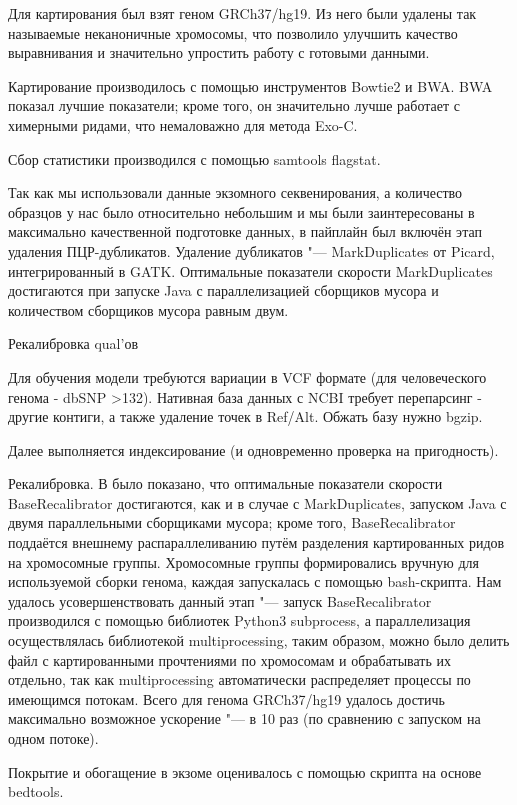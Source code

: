 \documentclass[a4paper,12pt]{article}
\begin{document}
Для картирования был взят геном GRCh37/hg19.
Из него были удалены так называемые неканоничные хромосомы, что позволило улучшить качество выравнивания и значительно упростить работу с готовыми данными.

Картирование производилось с помощью инструментов Bowtie2\cite{bowtie2} и BWA\cite{bwa}.
BWA показал лучшие показатели;
кроме того, он значительно лучше работает с химерными ридами, что немаловажно для метода Exo-C.

Сбор статистики производился с помощью samtools flagstat.

Так как мы использовали данные экзомного секвенирования, а количество образцов у нас было относительно небольшим и мы были заинтересованы в максимально качественной подготовке данных, в пайплайн был включён этап удаления ПЦР-дубликатов.
Удаление дубликатов "--- MarkDuplicates от Picard\cite{picard}, интегрированный в GATK.
Оптимальные показатели скорости MarkDuplicates достигаются при запуске Java с параллелизацией сборщиков мусора и количеством сборщиков мусора равным двум\cite{heldenbrand}.

Рекалибровка qual'ов

Для обучения модели требуются вариации в VCF формате (для человеческого генома - dbSNP >132). Нативная база данных с NCBI требует перепарсинг - другие контиги, а также удаление точек в Ref/Alt. Обжать базу нужно bgzip.

Далее выполняется индексирование (и одновременно проверка на пригодность).

Рекалибровка.
В \cite{heldenbrand} было показано, что оптимальные показатели скорости BaseRecalibrator достигаются, как и в случае с MarkDuplicates, запуском Java с двумя параллельными сборщиками мусора;
кроме того, BaseRecalibrator поддаётся внешнему распараллеливанию путём разделения картированных ридов на хромосомные группы.
Хромосомные группы формировались вручную для используемой сборки генома, каждая запускалась с помощью bash-скрипта.
Нам удалось усовершенствовать данный этап "--- запуск BaseRecalibrator производился с помощью библиотек Python3 subprocess, а параллелизация осуществлялась библиотекой multiprocessing, таким образом, можно было делить файл с картированными прочтениями по хромосомам и обрабатывать их отдельно, так как multiprocessing автоматически распределяет процессы по имеющимся потокам.
Всего для генома GRCh37/hg19 удалось достичь максимально возможное ускорение "--- в 10 раз (по сравнению с запуском на одном потоке).

Покрытие и обогащение в экзоме оценивалось с помощью скрипта на основе bedtools\cite{bedtools}.
\end{document}
